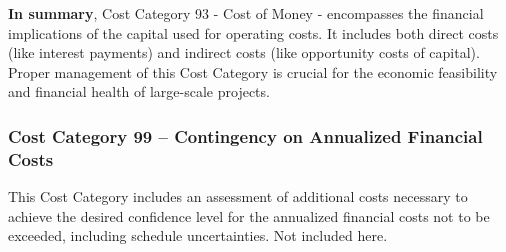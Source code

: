 \textbf{In summary}, Cost Category 93 - Cost of Money - encompasses the financial implications of the capital used for operating costs. It includes both direct costs (like interest payments) and indirect costs (like opportunity costs of capital). Proper management of this Cost Category is crucial for the economic feasibility and financial health of large-scale projects.




\subsubsection*{Cost Category 99 – Contingency on Annualized Financial Costs}
This Cost Category includes an assessment of additional costs necessary to achieve the desired confidence level for the annualized financial costs not to be exceeded, including schedule uncertainties. Not included here.
